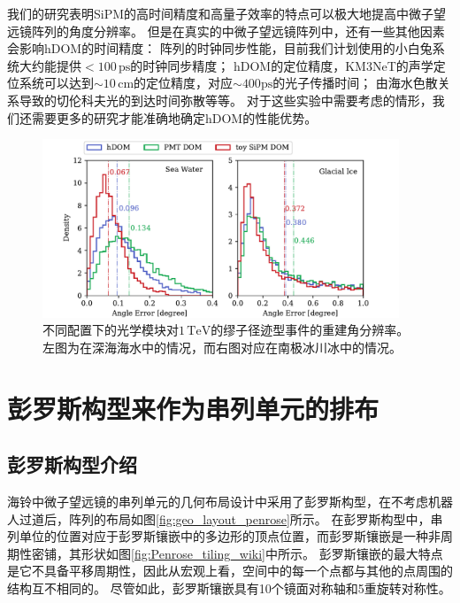 我们的研究表明SiPM的高时间精度和高量子效率的特点可以极大地提高中微子望远镜阵列的角度分辨率。
但是在真实的中微子望远镜阵列中，还有一些其他因素会影响hDOM的时间精度：
阵列的时钟同步性能，目前我们计划使用的小白兔系统\cite{white_rabbit:2013}大约能提供$< 100 \,\mathrm{ps}$的时钟同步精度；
hDOM的定位精度，KM3NeT的声学定位系统\cite{KM3NeT_acoustic:2022}可以达到$\sim 10 \,\mathrm{cm}$的定位精度，对应$\sim 400 \mathrm{ps}$的光子传播时间；
由海水色散关系导致的切伦科夫光的到达时间弥散等等。
对于这些实验中需要考虑的情形，我们还需要更多的研究才能准确地确定hDOM的性能优势。


\begin{figure}[!htb]%
    \centering
    \includegraphics[width=0.95\textwidth]{img/hdom_angular_resolution_total.pdf}
    \caption{不同配置下的光学模块对$1\,\mathrm{TeV}$的缪子径迹型事件的重建角分辨率。左图为在深海海水中的情况，而右图对应在南极冰川冰中的情况。}
    \label{fig:hdom_angular_resolution_total}
\end{figure}





\section{彭罗斯构型来作为串列单元的排布}

\subsection{彭罗斯构型介绍}

海铃中微子望远镜的串列单元的几何布局设计中采用了彭罗斯构型，在不考虑机器人过道后，阵列的布局如图\ref{fig:geo_layout_penrose}所示。
在彭罗斯构型中，串列单位的位置对应于彭罗斯镶嵌中的多边形的顶点位置，而彭罗斯镶嵌是一种非周期性密铺\cite{tilings_and_patterns:1987}，其形状如图\ref{fig:Penrose_tiling_wiki}中所示。
彭罗斯镶嵌的最大特点是它不具备平移周期性，因此从宏观上看，空间中的每一个点都与其他的点周围的结构互不相同的。
尽管如此，彭罗斯镶嵌具有10个镜面对称轴和5重旋转对称性。

